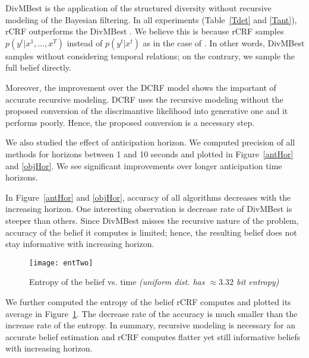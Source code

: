 DivMBest\cite{divmbest} is the application of the structured diversity without recursive modeling of the Bayesian filtering. In all experiments (Table~\ref{Tdet} and \ref{Tant}), rCRF outperforms the DivMBest \cite{divmbest}. We believe this is because rCRF samples  $p(y^t|x^1,\ldots,x^T)$ instead of $p(y^t|x^t)$ as in the case of \cite{divmbest}. In other words, DivMBest \cite{divmbest} samples without considering temporal relations; on the contrary, we sample the full belief directly.

Moreover, the improvement over the DCRF model shows the important of accurate recursive modeling. DCRF uses the recursive modeling without the proposed conversion of the discrimantive likelihood into generative one and it performs poorly. Hence, the proposed conversion is a necessary step.

We also studied the effect of anticipation horizon. We computed precision of all methods for horizons between 1 and 10 seconds and plotted in Figure~\ref{antHor} and \ref{objHor}. We see significant improvements over longer anticipation time horizons.%

In Figure~\ref{antHor} and \ref{objHor}, accuracy of all algorithms decreases with the increasing horizon. One interesting observation is decrease rate of DivMBest is steeper than others. Since DivMBest misses the recursive nature of the problem, accuracy of the belief it computes is limited; hence, the resulting belief does not stay informative with increasing horizon.

\begin{figure}[ht]
\begin{center}
\texttt{[image: entTwo]}
\caption{Entropy of the belief vs. time \emph{(uniform dist. has $\approx 3.32$ bit entropy)}}
\label{entRop}
\end{center}
\end{figure}

We further computed the entropy of the belief rCRF computes and plotted its average in Figure~\ref{entRop}. The decrease rate of the accuracy is much smaller than the increase rate of the entropy. In summary, recursive modeling is necessary for an accurate belief estimation and rCRF computes flatter yet still informative beliefs with increasing horizon.

